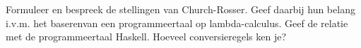 \begin{question}
	Formuleer en bespreek de stellingen van Church-Rosser. Geef daarbij hun belang i.v.m. het baserenvan een programmeertaal op lambda-calculus. Geef de relatie met de programmeertaal Haskell. Hoeveel conversieregels ken je?
\end{question}

\lipsum[1-2]